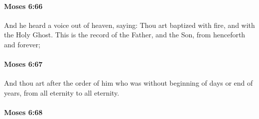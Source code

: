 
		\paragraph{Moses 6:66} %
			\label{MOSES-6-66}

			And he heard a voice out of heaven, saying: Thou art baptized with fire, and with the Holy Ghost. This is the record of the Father, and the Son, from henceforth and forever;


		\paragraph{Moses 6:67} %
			\label{MOSES-6-67}

			And thou art after the order of him who was without beginning of days or end of years, from all eternity to all eternity.


		\paragraph{Moses 6:68} %
			\label{MOSES-6-68}

